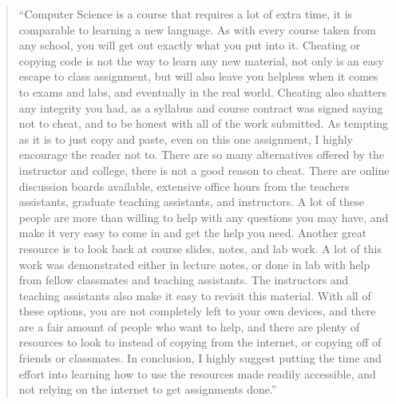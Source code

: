 \documentclass[12pt]{scrartcl}
\begin{document}
\begin{quote}
``Computer Science is a course that requires a lot of extra time, it is comparable to learning a new language. As with every course taken from any school, you will get out exactly what you put into it. Cheating or copying code is not the way to learn any new material, not only is an easy escape to class assignment, but will also leave you helpless when it comes to exams and labs, and eventually in the real world. Cheating also shatters any integrity you had, as a syllabus and course contract was signed saying not to cheat, and to be honest with all of the work submitted. As tempting as it is to just copy and paste, even on this one assignment, I highly encourage the reader not to. There are so many alternatives offered by the instructor and college, there is not a good reason to cheat. There are online discussion boards available, extensive office hours from the teachers assistants, graduate teaching assistants, and instructors. A lot of these people are more than willing to help with any questions you may have, and make it very easy to come in and get the help you need. Another great resource is to look back at course slides, notes, and lab work. A lot of this work was demonstrated either in lecture notes, or done in lab with help from fellow classmates and teaching assistants. The instructors and teaching assistants also make it easy to revisit this material.  With all of these options, you are not completely left to your own devices, and there are a fair amount of people who want to help, and there are plenty of resources to look to instead of copying from the internet, or copying off of friends or classmates. In conclusion, I highly suggest putting the time and effort into learning how to use the resources made readily accessible, and not relying on the internet to get assignments done.'' 
\end{quote}
\end{document}
